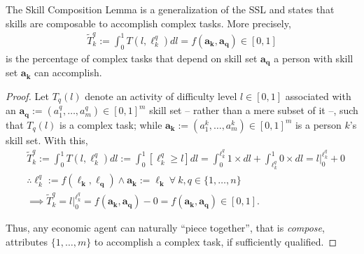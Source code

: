 \documentclass[hidelinks, nonatbib]{elsarticle}
\begin{document}
\begin{lemma}
    \label{scl}
    The Skill Composition Lemma is a generalization of the SSL and states that skills are composable to accomplish complex tasks. More precisely,
    \begin{gather}
        \tilde{T}_{k}^{q}
        :=
        \int_{0}^{1}
        T(l, \ell_{k}^{q})
        dl
        =
        f(\boldsymbol{a_k}, \boldsymbol{a_q})
        \in
        [0,1]
    \end{gather}
    is the percentage of complex tasks that depend on skill set $\boldsymbol{a_q}$ a person with skill set 
    $\boldsymbol{a_k}$ can accomplish.
    \begin{proof}
        Let $T_{q}(l)$ denote an activity of difficulty level $l \in [0,1]$ associated with an $\boldsymbol{a_q} := (a_{1}^{q}, \dots, a_{m}^{q}) \in [0,1]^m$ skill set -- rather than a mere subset of it --, such that $T_{q}(l)$ is a complex task; while $\boldsymbol{a_k} := (a_{1}^{k}, \dots, a_{m}^{k}) \in [0,1]^m$ is a person $k$'s skill set. With this,
        \begin{align}
            &
            \tilde{T}_{k}^{q}
            :=
            \int_{0}^{1}
            T(l, \ell_{k}^{q})
            dl
            :=
            \int_{0}^{1}
            [
                \ell_{k}^{q}
                \geq
                l
            ]
            dl
            =
            \int_{0}^{\ell_{k}^{q}}
            1
            \times
            dl
            +
            \int_{\ell_{k}^{q}}^{1}
            0
            \times
            dl
            =
            l\big|_{0}^{\ell_{k}^{q}}
            + 0
            \\
            &
            \therefore
            \ell_{k}^{q}
            :=
            f(\boldsymbol{\ell_k}, \boldsymbol{\ell_q})
            \land
            \boldsymbol{a_k}
            :=
            \boldsymbol{\ell_k}
            \
            \forall
            \
            k,q \in \{1, \dots, n\}
            \\
            &
            \implies
            \tilde{T}_{k}^{q}
            =
            l\big|_{0}^{\ell_{k}^{q}}
            =
            f(\boldsymbol{a_k}, \boldsymbol{a_q})
            - 0
            =
            f(\boldsymbol{a_k}, \boldsymbol{a_q})
            \in
            [0,1]
            .
        \end{align}
        
        Thus, any economic agent can naturally ``piece together'', that is \textit{compose}, attributes $\{1, \dots, m\}$ to accomplish a complex task, if sufficiently qualified.
    \end{proof}
\end{lemma}
\end{document}
